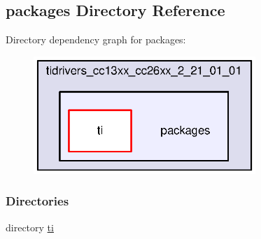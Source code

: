 \subsection{packages Directory Reference}
\label{dir_66ebce97428d8a203c418c1e1c30b1d0}
Directory dependency graph for packages\+:
\nopagebreak
\begin{figure}[H]
\begin{center}
\leavevmode
\includegraphics[width=238pt]{dir_66ebce97428d8a203c418c1e1c30b1d0_dep}
\end{center}
\end{figure}
\subsubsection*{Directories}
\begin{DoxyCompactItemize}
\item 
directory \hyperlink{dir_bb9bb6c41181976c26c510dde001be8f}{ti}
\end{DoxyCompactItemize}
